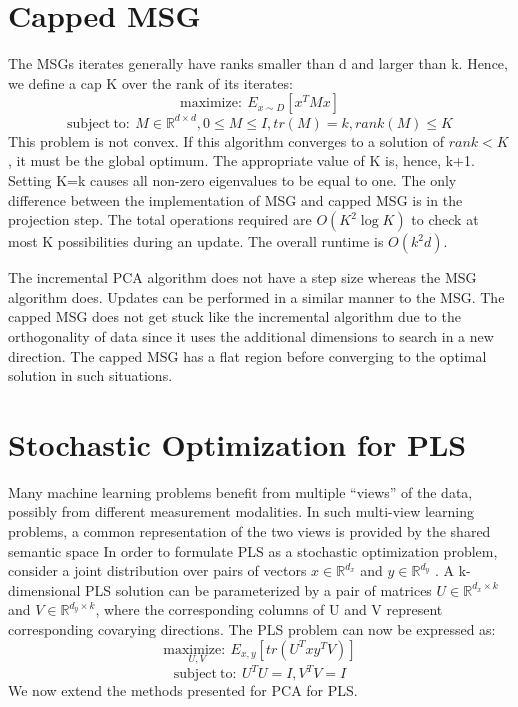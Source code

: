 \documentclass{article}
\begin{document}
\section{Capped MSG}
The MSGs iterates generally have ranks smaller than d and larger than k. Hence, we define a cap K over the rank of its iterates:
\begin{equation}\label{eq:6} 
\mathrm{maximize :\ }E_{x\sim D}\left[ x^{T}Mx\right]
\end{equation}
\begin{equation}
\mathrm{subject\ to :\ }M\in \mathbb{R} ^{d\times d},0\leq M\leq I,tr\left( M\right) =k,rank\left( M\right) \leq K
\end{equation}
This problem is not convex. If this algorithm converges to a solution of $rank < K$, it must be the global optimum. The appropriate value of K is, hence, k+1. Setting K=k causes all non-zero eigenvalues to be equal to one. The only difference between the implementation of MSG and capped MSG is in the projection step. The total operations required are $O\left( K^{2}\log K\right) $ to check at most K possibilities during an update. The overall runtime is $O\left(k^{2}d\right) $.

The incremental PCA algorithm does not have a step size whereas the MSG algorithm does. Updates can be performed in a similar manner to the MSG. The capped MSG does not get stuck like the incremental algorithm due to the orthogonality of data since it uses the additional dimensions to search in a new direction. The capped MSG has a flat region before converging to the optimal solution in such situations.

\section{Stochastic Optimization for PLS}

Many machine learning problems benefit from multiple “views” of the data, possibly from different measurement modalities. In such multi-view learning problems, a common representation of the two views is provided by the shared semantic space
In order to formulate PLS as a stochastic optimization problem, consider a joint distribution over pairs of vectors $x\in \mathbb{R} ^{d_{x}}$ and $y\in \mathbb{R} ^{d_{y}}$ . A k-dimensional PLS solution can be parameterized by a pair of matrices $U\in \mathbb{R} ^{d_{x}\times k}$ and $V\in \mathbb{R} ^{d_{y}\times k}$, where the corresponding columns of U and V represent corresponding covarying directions. The PLS problem can now be expressed as:
\begin{equation}
\underset{U,V}{\mathrm{maximize :\ }}E_{x,y}\left[ tr\left( U^{T}xy^{T}V\right) \right] 
\end{equation}
\begin{equation}
\mathrm{subject\ to :\ }U^{T}U=I,V^{T}V=I
\end{equation}
We now extend the methods presented for PCA for PLS.
\end{document}

